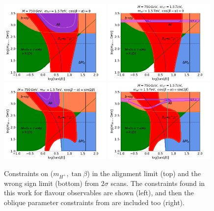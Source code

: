 \documentclass[a4paper,12pt]{article}
\begin{document}
\begin{figure}[ht]
    \centering
    \includegraphics[width=0.49\textwidth]{../global/global_test.png}
    \includegraphics[width=0.49\textwidth]{../global/global_test2.png}
    \includegraphics[width=0.49\textwidth]{../global/global_test5.png}
    \includegraphics[width=0.49\textwidth]{../global/global_test6.png}
    \caption{\label{fig:global}Constraints on ($m_{H^+},\tan\beta$) in the alignment limit (top) and the wrong sign limit (bottom) from $2\sigma$ scans. 
    The constraints found in this work for flavour observables are shown (left), and then the oblique parameter constraints from \cite{james} are included too (right). 
}
\end{figure}
\end{document}
